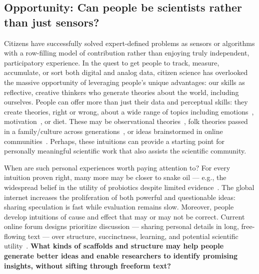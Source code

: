 \subsection{Opportunity: Can people be scientists rather than just sensors?}
Citizens have successfully solved expert-defined problems as sensors or algorithms with a 
row-filling model of contribution rather than enjoying truly independent, participatory experience. 
In the quest to get people to track, measure, accumulate, or
sort both digital and analog data, citizen science has overlooked the massive 
opportunity of leveraging people’s unique advantages: our skills as reflective, 
creative thinkers who generate theories about the world, including ourselves.
People can offer more than just their data and perceptual
skills: they create theories, right or wrong, about a wide
range of topics including emotions~\cite{Johnson-Laird1992a}, motivation~\cite{Markus1991}, or
diet. These may be observational theories~\cite{Kempton1986}, folk theories
passed in a family/culture across generations~\cite{Gelman2011}, or ideas
brainstormed in online communities~\cite{23andme2016}. Perhaps, these intuitions 
can provide a starting point for personally meaningful scientific work that also assists the scientific community.

When are such personal experiences worth paying attention
to? For every intuition proven right, many more may be
closer to snake oil — e.g., the widespread belief in the utility
of probiotics despite limited evidence~\cite{Bonifait2009}. The global internet
increases the proliferation of both powerful and questionable
ideas: sharing speculation is fast while evaluation remains
slow. Moreover, people develop intuitions of cause and effect
that may or may not be correct. Current online forum
designs prioritize discussion — sharing personal details in
long, free-flowing text — over structure, succinctness, learning,
and potential scientific utility~\cite{Thomas2002}. \textbf{What kinds of scaffolds
and structure may help people generate better ideas and
enable researchers to identify promising insights, without
sifting through freeform text?}

